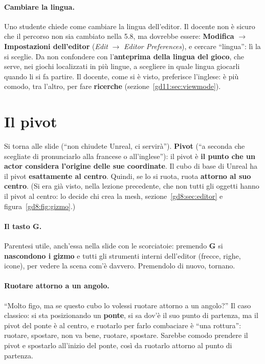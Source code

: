 \paragraph{Cambiare la lingua.} Uno studente chiede come cambiare la lingua
dell'editor. Il docente non è sicuro che il percorso non sia cambiato nella 5.8,
ma dovrebbe essere: \textbf{Modifica} $\rightarrow$ \textbf{Impostazioni
dell'editor} (\emph{Edit} $\rightarrow$ \emph{Editor Preferences}), e cercare
``lingua'': lì la si sceglie. Da non confondere con l'\textbf{anteprima della
lingua del gioco}, che serve, nei giochi localizzati in più lingue, a scegliere
in quale lingua giocarli quando li si fa partire. Il docente, come si è visto,
preferisce l'inglese: è più comodo, tra l'altro, per fare \textbf{ricerche}
(sezione~\ref{gd11:sec:viewmode}).

\section{Il pivot}
\label{gd11:sec:pivot}



Si torna alle slide (``non chiudete Unreal, ci servirà''). \textbf{Pivot} (``a
seconda che scegliate di pronunciarlo alla francese o all'inglese''): il pivot è
\textbf{il punto che un actor considera l'origine delle sue coordinate}. Il cubo
di base di Unreal ha il pivot \textbf{esattamente al centro}. Quindi, se lo si
ruota, ruota \textbf{attorno al suo centro}. (Si era già visto, nella lezione
precedente, che non tutti gli oggetti hanno il pivot al centro: lo decide chi
crea la mesh, sezione~\ref{gd8:sec:editor} e figura~\ref{gd8:fig:gizmo}.)

\paragraph{Il tasto G.} Parentesi utile, anch'essa nella slide con le
scorciatoie: premendo \textbf{G} si \textbf{nascondono i gizmo} e tutti gli
strumenti interni dell'editor (frecce, righe, icone), per vedere la scena com'è
davvero. Premendolo di nuovo, tornano.

\paragraph{Ruotare attorno a un angolo.} ``Molto figo, ma se questo cubo lo
volessi ruotare attorno a un angolo?'' Il caso classico: si sta posizionando un
\textbf{ponte}, si sa dov'è il suo punto di partenza, ma il pivot del ponte è al
centro, e ruotarlo per farlo combaciare è ``una rottura'': ruotare, spostare,
non va bene, ruotare, spostare. Sarebbe comodo prendere il pivot e spostarlo
all'inizio del ponte, così da ruotarlo attorno al punto di partenza.

